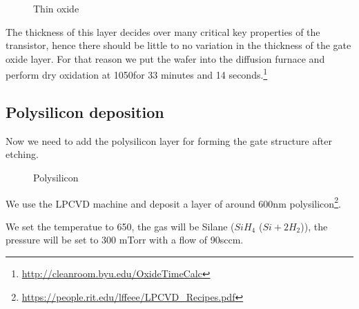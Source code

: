\begin{figure}[H]
	\centering
	\begin{tikzpicture}[node distance = 3cm, auto, thick,scale=\CrossSectionOnly, every node/.style={transform shape}]
		
	\end{tikzpicture}
	\drawStepArrow{}
	\begin{tikzpicture}[node distance = 3cm, auto, thick,scale=\CrossSectionOnly, every node/.style={transform shape}]
		
	\end{tikzpicture}
	\caption{Thin oxide}
\end{figure}
The thickness of this layer decides over many critical key properties of the transistor, hence there should be little to no variation in the thickness of the gate oxide layer.
For that reason we put the wafer into the diffusion furnace and perform dry oxidation at 1050\degreesC for 33 minutes and 14 seconds.\footnote{\url{http://cleanroom.byu.edu/OxideTimeCalc}}

\subsection{Polysilicon deposition}\label{step_depositing_poly}

Now we need to add the polysilicon layer for forming the gate structure after etching.

\begin{figure}[H]
	\centering
	\begin{tikzpicture}[node distance = 3cm, auto, thick,scale=\CrossSectionOnly, every node/.style={transform shape}]
		
	\end{tikzpicture}
	\drawStepArrow{}
	\begin{tikzpicture}[node distance = 3cm, auto, thick,scale=\CrossSectionOnly, every node/.style={transform shape}]
		
	\end{tikzpicture}
	\caption{Polysilicon}
\end{figure}

We use the LPCVD machine and deposit a layer of around 600nm polysilicon\footnote{\url{https://people.rit.edu/lffeee/LPCVD_Recipes.pdf}}.

We set the temperatue to 650\degreesC, the gas will be Silane ($Si H_4$ ($Si + 2H_2$)), the pressure will be set to 300 mTorr with a flow of 90sccm.

